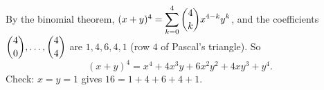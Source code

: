 By the binomial theorem, $(x+y)^4=\displaystyle\sum_{k=0}^{4}\dbinom{4}{k}x^{4-k}y^k$, and the coefficients $\dbinom{4}{0},\dots,\dbinom{4}{4}$ are $1,4,6,4,1$ (row $4$ of Pascal's triangle). So
\[
(x+y)^4=\boxed{x^4+4x^3y+6x^2y^2+4xy^3+y^4}.
\]
Check: $x=y=1$ gives $16=1+4+6+4+1$.
